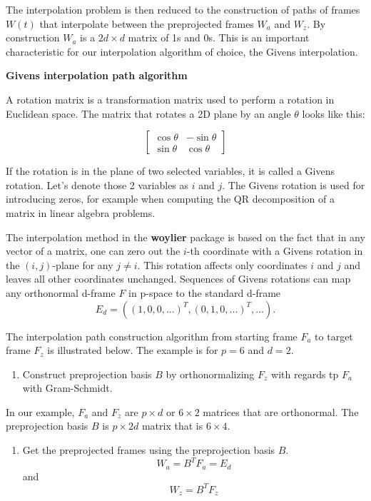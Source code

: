 The interpolation problem is then reduced to the construction of paths
of frames \(W(t)\) that interpolate between the preprojected frames
\(W_a\) and \(W_z\). By construction \(W_a\) is a \(2d\times d\) matrix
of 1s and 0s. This is an important characteristic for our interpolation
algorithm of choice, the Givens interpolation.

\textbf{Givens interpolation path algorithm}

A rotation matrix is a transformation matrix used to perform a rotation
in Euclidean space. The matrix that rotates a 2D plane by an angle
\(\theta\) looks like this:

\[ \begin{bmatrix}\cos \theta &-\sin \theta \\\sin \theta &\cos \theta \end{bmatrix} \]

If the rotation is in the plane of two selected variables, it is called
a Givens rotation. Let's denote those 2 variables as \(i\) and \(j\).
The Givens rotation is used for introducing zeros, for example when
computing the QR decomposition of a matrix in linear algebra problems.

The interpolation method in the \textbf{woylier} package is based on the
fact that in any vector of a matrix, one can zero out the \(i\)-th
coordinate with a Givens rotation \citep{matrix_computation} in the
\((i, j)\)-plane for any \(j\neq i\). This rotation affects only
coordinates \(i\) and \(j\) and leaves all other coordinates unchanged.
Sequences of Givens rotations can map any orthonormal d-frame \(F\) in
p-space to the standard d-frame
\[E_d=((1, 0, 0, ...)^T, (0, 1, 0, ...)^T, ...).\]

The interpolation path construction algorithm from starting frame
\(F_a\) to target frame \(F_z\) is illustrated below. The example is for
\(p=6\) and \(d=2\).

\begin{enumerate}
\def\labelenumi{\arabic{enumi}.}
\tightlist
\item
  Construct preprojection basis \(B\) by orthonormalizing \(F_z\) with
  regards tp \(F_a\) with Gram-Schmidt.
\end{enumerate}

In our example, \(F_a\) and \(F_z\) are \(p\times d\) or \(6\times2\)
matrices that are orthonormal. The preprojection basis \(B\) is
\(p\times 2d\) matrix that is \(6\times 4\).

\begin{enumerate}
\def\labelenumi{\arabic{enumi}.}
\setcounter{enumi}{1}
\tightlist
\item
  Get the preprojected frames using the preprojection basis \(B\).
  \[W_a = B^TF_a = E_d\] and \[W_z = B^TF_z\]
\end{enumerate}

